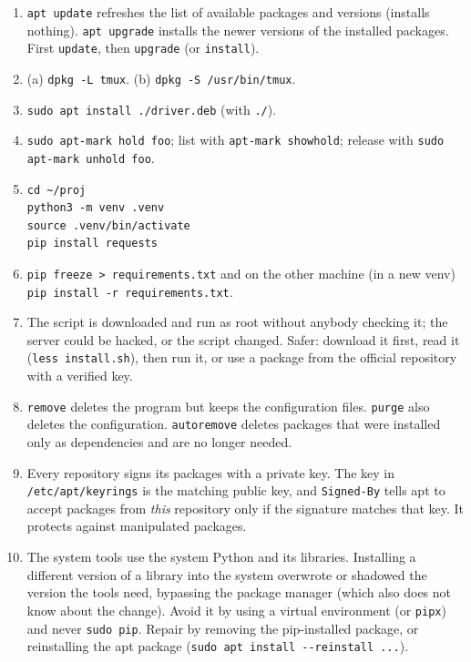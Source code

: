 \begin{enumerate}[label=\textbf{\ansnum.\arabic*}]
  \item \texttt{apt update} refreshes the list of available packages and versions (installs nothing). \texttt{apt upgrade} installs the newer versions of the installed packages. First \texttt{update}, then \texttt{upgrade} (or \texttt{install}).
  \item (a) \verb|dpkg -L tmux|. (b) \verb|dpkg -S /usr/bin/tmux|.
  \item \verb|sudo apt install ./driver.deb| (with \verb|./|).
  \item \verb|sudo apt-mark hold foo|; list with \verb|apt-mark showhold|; release with \verb|sudo apt-mark unhold foo|.
  \item \begin{verbatim}
cd ~/proj
python3 -m venv .venv
source .venv/bin/activate
pip install requests
\end{verbatim}
  \item \verb|pip freeze > requirements.txt| and on the other machine (in a new venv) \verb|pip install -r requirements.txt|.
  \item The script is downloaded and run as root without anybody checking it; the server could be hacked, or the script changed. Safer: download it first, read it (\verb|less install.sh|), then run it, or use a package from the official repository with a verified key.
  \item \texttt{remove} deletes the program but keeps the configuration files. \texttt{purge} also deletes the configuration. \texttt{autoremove} deletes packages that were installed only as dependencies and are no longer needed.
  \item Every repository signs its packages with a private key. The key in \texttt{/etc/apt/keyrings} is the matching public key, and \texttt{Signed-By} tells apt to accept packages from \emph{this} repository only if the signature matches that key. It protects against manipulated packages.
  \item The system tools use the system Python and its libraries. Installing a different version of a library into the system overwrote or shadowed the version the tools need, bypassing the package manager (which also does not know about the change). Avoid it by using a virtual environment (or \texttt{pipx}) and never \texttt{sudo pip}. Repair by removing the pip-installed package, or reinstalling the apt package (\verb|sudo apt install --reinstall ...|).
\end{enumerate}
